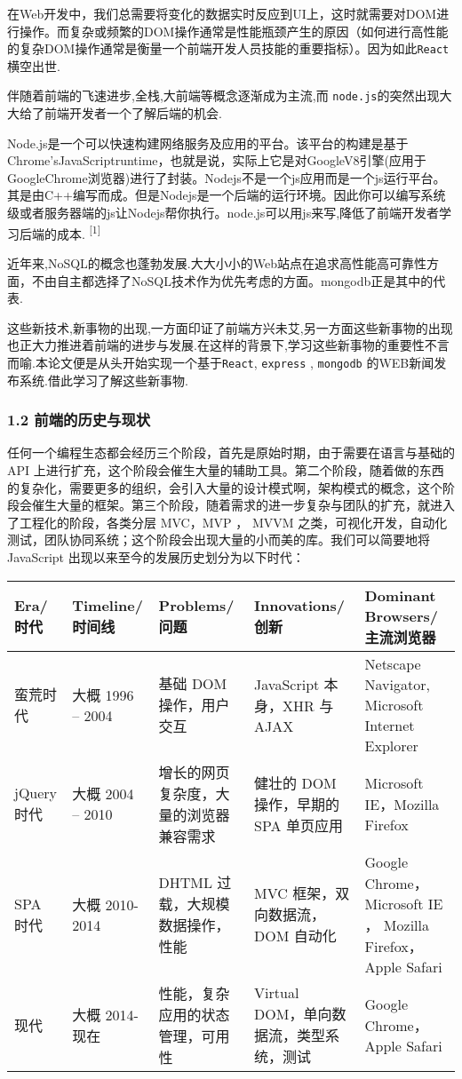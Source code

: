 \documentclass[]{article}
\begin{document}
在Web开发中，我们总需要将变化的数据实时反应到UI上，这时就需要对DOM进行操作。而复杂或频繁的DOM操作通常是性能瓶颈产生的原因（如何进行高性能的复杂DOM操作通常是衡量一个前端开发人员技能的重要指标）。因为如此\texttt{React}横空出世.

伴随着前端的飞速进步,全栈,大前端等概念逐渐成为主流,而
\texttt{node.js}的突然出现大大给了前端开发者一个了解后端的机会.

Node.js是一个可以快速构建网络服务及应用的平台。该平台的构建是基于Chrome'sJavaScriptruntime，也就是说，实际上它是对GoogleV8引擎(应用于GoogleChrome浏览器)进行了封装。Nodejs不是一个js应用而是一个js运行平台。其是由C++编写而成。但是Nodejs是一个后端的运行环境。因此你可以编写系统级或者服务器端的js让Nodejs帮你执行。node.js可以用js来写,降低了前端开发者学习后端的成本.
\textsuperscript{{[}1{]}}

近年来,NoSQL的概念也蓬勃发展.大大小小的Web站点在追求高性能高可靠性方面，不由自主都选择了NoSQL技术作为优先考虑的方面。mongodb正是其中的代表.

这些新技术,新事物的出现,一方面印证了前端方兴未艾,另一方面这些新事物的出现也正大力推进着前端的进步与发展.在这样的背景下,学习这些新事物的重要性不言而喻.本论文便是从头开始实现一个基于\texttt{React},
\texttt{express} , \texttt{mongodb}
的WEB新闻发布系统.借此学习了解这些新事物.

\hypertarget{header-n50}{%
\subsubsection{1.2 前端的历史与现状}\label{header-n50}}

任何一个编程生态都会经历三个阶段，首先是原始时期，由于需要在语言与基础的
API
上进行扩充，这个阶段会催生大量的辅助工具。第二个阶段，随着做的东西的复杂化，需要更多的组织，会引入大量的设计模式啊，架构模式的概念，这个阶段会催生大量的框架。第三个阶段，随着需求的进一步复杂与团队的扩充，就进入了工程化的阶段，各类分层
MVC，MVP ， MVVM
之类，可视化开发，自动化测试，团队协同系统；这个阶段会出现大量的小而美的库。我们可以简要地将
JavaScript 出现以来至今的发展历史划分为以下时代：

\begin{longtable}[]{@{}lllll@{}}
\toprule
Era/ 时代 & Timeline/ 时间线 & Problems/ 问题 & Innovations/ 创新 &
Dominant Browsers/ 主流浏览器\tabularnewline
\midrule
\endhead
蛮荒时代 & 大概 1996 -- 2004 & 基础 DOM 操作，用户交互 & JavaScript
本身，XHR 与 AJAX & Netscape Navigator, Microsoft Internet
Explorer\tabularnewline
jQuery 时代 & 大概 2004 -- 2010 & 增长的网页复杂度，大量的浏览器兼容需求
& 健壮的 DOM 操作，早期的 SPA 单页应用 & Microsoft IE，Mozilla
Firefox\tabularnewline
SPA 时代 & 大概 2010-2014 & DHTML 过载，大规模数据操作，性能 & MVC
框架，双向数据流，DOM 自动化 & Google Chrome，Microsoft IE ， Mozilla
Firefox，Apple Safari\tabularnewline
现代 & 大概 2014- 现在 & 性能，复杂应用的状态管理，可用性 & Virtual
DOM，单向数据流，类型系统，测试 & Google Chrome，Apple
Safari\tabularnewline
\bottomrule
\end{longtable}
\end{document}

